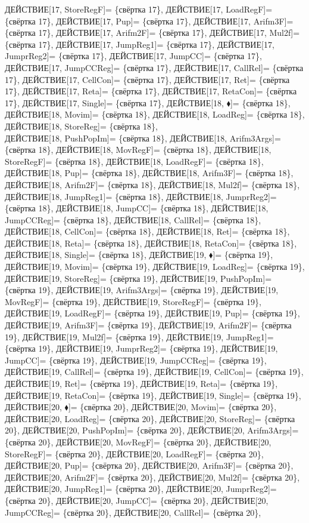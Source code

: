 \documentclass[a0]{a0poster}
\begin{document}
ДЕЙСТВИЕ[17, StoreRegF]= \{свёртка 17\}, ДЕЙСТВИЕ[17, LoadRegF]= \{свёртка 17\}, ДЕЙСТВИЕ[17, Pup]= \{свёртка 17\}, ДЕЙСТВИЕ[17, Arifm3F]= \{свёртка 17\}, ДЕЙСТВИЕ[17, Arifm2F]= \{свёртка 17\}, ДЕЙСТВИЕ[17, Mul2f]= \{свёртка 17\}, ДЕЙСТВИЕ[17, JumpReg1]= \{свёртка 17\}, ДЕЙСТВИЕ[17, JumprReg2]= \{свёртка 17\}, ДЕЙСТВИЕ[17, JumpCC]= \{свёртка 17\}, ДЕЙСТВИЕ[17, JumpCCReg]= \{свёртка 17\}, ДЕЙСТВИЕ[17, CallRel]= \{свёртка 17\}, ДЕЙСТВИЕ[17, CellCon]= \{свёртка 17\}, ДЕЙСТВИЕ[17, Ret]= \{свёртка 17\}, ДЕЙСТВИЕ[17, Reta]= \{свёртка 17\}, ДЕЙСТВИЕ[17, RetaCon]= \{свёртка 17\}, ДЕЙСТВИЕ[17, Single]= \{свёртка 17\}, ДЕЙСТВИЕ[18, $\blacklozenge$]= \{свёртка 18\}, ДЕЙСТВИЕ[18, Movim]= \{свёртка 18\}, ДЕЙСТВИЕ[18, LoadReg]= \{свёртка 18\}, ДЕЙСТВИЕ[18, StoreReg]= \{свёртка 18\}, \\
ДЕЙСТВИЕ[18, PushPopIm]= \{свёртка 18\}, ДЕЙСТВИЕ[18, Arifm3Args]= \{свёртка 18\}, ДЕЙСТВИЕ[18, MovRegF]= \{свёртка 18\}, ДЕЙСТВИЕ[18, StoreRegF]= \{свёртка 18\}, ДЕЙСТВИЕ[18, LoadRegF]= \{свёртка 18\}, ДЕЙСТВИЕ[18, Pup]= \{свёртка 18\}, ДЕЙСТВИЕ[18, Arifm3F]= \{свёртка 18\}, ДЕЙСТВИЕ[18, Arifm2F]= \{свёртка 18\}, ДЕЙСТВИЕ[18, Mul2f]= \{свёртка 18\}, ДЕЙСТВИЕ[18, JumpReg1]= \{свёртка 18\}, ДЕЙСТВИЕ[18, JumprReg2]= \{свёртка 18\}, ДЕЙСТВИЕ[18, JumpCC]= \{свёртка 18\}, ДЕЙСТВИЕ[18, JumpCCReg]= \{свёртка 18\}, ДЕЙСТВИЕ[18, CallRel]= \{свёртка 18\}, ДЕЙСТВИЕ[18, CellCon]= \{свёртка 18\}, ДЕЙСТВИЕ[18, Ret]= \{свёртка 18\}, ДЕЙСТВИЕ[18, Reta]= \{свёртка 18\}, ДЕЙСТВИЕ[18, RetaCon]= \{свёртка 18\}, ДЕЙСТВИЕ[18, Single]= \{свёртка 18\}, ДЕЙСТВИЕ[19, $\blacklozenge$]= \{свёртка 19\}, \\
ДЕЙСТВИЕ[19, Movim]= \{свёртка 19\}, ДЕЙСТВИЕ[19, LoadReg]= \{свёртка 19\}, ДЕЙСТВИЕ[19, StoreReg]= \{свёртка 19\}, ДЕЙСТВИЕ[19, PushPopIm]= \{свёртка 19\}, ДЕЙСТВИЕ[19, Arifm3Args]= \{свёртка 19\}, ДЕЙСТВИЕ[19, MovRegF]= \{свёртка 19\}, ДЕЙСТВИЕ[19, StoreRegF]= \{свёртка 19\}, ДЕЙСТВИЕ[19, LoadRegF]= \{свёртка 19\}, ДЕЙСТВИЕ[19, Pup]= \{свёртка 19\}, ДЕЙСТВИЕ[19, Arifm3F]= \{свёртка 19\}, ДЕЙСТВИЕ[19, Arifm2F]= \{свёртка 19\}, ДЕЙСТВИЕ[19, Mul2f]= \{свёртка 19\}, ДЕЙСТВИЕ[19, JumpReg1]= \{свёртка 19\}, ДЕЙСТВИЕ[19, JumprReg2]= \{свёртка 19\}, ДЕЙСТВИЕ[19, JumpCC]= \{свёртка 19\}, ДЕЙСТВИЕ[19, JumpCCReg]= \{свёртка 19\}, ДЕЙСТВИЕ[19, CallRel]= \{свёртка 19\}, ДЕЙСТВИЕ[19, CellCon]= \{свёртка 19\}, ДЕЙСТВИЕ[19, Ret]= \{свёртка 19\}, ДЕЙСТВИЕ[19, Reta]= \{свёртка 19\}, \\
ДЕЙСТВИЕ[19, RetaCon]= \{свёртка 19\}, ДЕЙСТВИЕ[19, Single]= \{свёртка 19\}, ДЕЙСТВИЕ[20, $\blacklozenge$]= \{свёртка 20\}, ДЕЙСТВИЕ[20, Movim]= \{свёртка 20\}, ДЕЙСТВИЕ[20, LoadReg]= \{свёртка 20\}, ДЕЙСТВИЕ[20, StoreReg]= \{свёртка 20\}, ДЕЙСТВИЕ[20, PushPopIm]= \{свёртка 20\}, ДЕЙСТВИЕ[20, Arifm3Args]= \{свёртка 20\}, ДЕЙСТВИЕ[20, MovRegF]= \{свёртка 20\}, ДЕЙСТВИЕ[20, StoreRegF]= \{свёртка 20\}, ДЕЙСТВИЕ[20, LoadRegF]= \{свёртка 20\}, ДЕЙСТВИЕ[20, Pup]= \{свёртка 20\}, ДЕЙСТВИЕ[20, Arifm3F]= \{свёртка 20\}, ДЕЙСТВИЕ[20, Arifm2F]= \{свёртка 20\}, ДЕЙСТВИЕ[20, Mul2f]= \{свёртка 20\}, ДЕЙСТВИЕ[20, JumpReg1]= \{свёртка 20\}, ДЕЙСТВИЕ[20, JumprReg2]= \{свёртка 20\}, ДЕЙСТВИЕ[20, JumpCC]= \{свёртка 20\}, ДЕЙСТВИЕ[20, JumpCCReg]= \{свёртка 20\}, ДЕЙСТВИЕ[20, CallRel]= \{свёртка 20\}, \\
\end{document}

